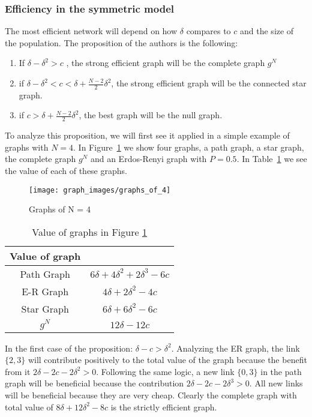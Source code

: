 \documentclass[a4paper, 11pt]{article}
\begin{document}
\subsubsection*{Efficiency in the symmetric model}
The most efficient network will depend on how $\delta$ compares to $c$ and the size of the population. The proposition of the authors is the following:
\begin{enumerate}
	\item If $\delta - \delta ^ 2 > c$ , the strong efficient graph will be the complete graph $g^N$
	\item if $\delta - \delta ^ 2 < c < \delta + \frac{N - 2}{2}\delta^2$, the strong efficient graph will be the connected star graph.
	\item if $c > \delta + \frac{N - 2}{2}\delta^2$, the best graph will be the null graph.
\end{enumerate}

To analyze this proposition, we will first see it applied in a simple example of graphs with $N=4$. In Figure~\ref{fig:graphs_of_4} we show four graphs, a path graph, a star graph, the complete graph $g^N$ and an Erdos-Renyi graph with $P = 0.5$. In Table~\ref{Tab:Values_of_4} we see the value of each of these graphs. 

\begin{figure}[hbt!]
    \centering
     \caption{Graphs of N = 4}
     \label{fig:graphs_of_4}
    \texttt{[image: graph\_images/graphs\_of\_4]}
\end{figure}
\begin{table}[ht]
\caption{Value of graphs in Figure \ref{fig:graphs_of_4}}
\label{Tab:Values_of_4}
	\begin{center}
		\begin{tabular}{c c} 
 		\hline
 		Value of graph \\ [0.5ex] 
 		\hline
 		Path Graph & $6\delta + 4\delta^2 + 2\delta^3 - 6c$\\
 		 E-R Graph & $4\delta + 2\delta^2 - 4c$\\
 		 Star Graph & $6\delta + 6\delta^2 - 6c$\\
   		$g^N$ & $12\delta - 12c$ \\ [1ex] 
 		\end{tabular}
	\end{center}
\end{table}

In the first case of the proposition:  $\delta - c > \delta^2$. Analyzing the ER graph, the link $\{2, 3\}$ will contribute positively to the total value of the graph because the benefit from it $2\delta - 2c - 2\delta^2 > 0$. Following the same logic, a new link $\{0, 3\}$ in the path graph will be beneficial because the contribution $2\delta - 2c - 2\delta^3 > 0$. All new links will be beneficial because they are very cheap. Clearly the complete graph with total value of $8\delta + 12\delta^2 - 8c$ is the strictly efficient graph.\\
\end{document}
